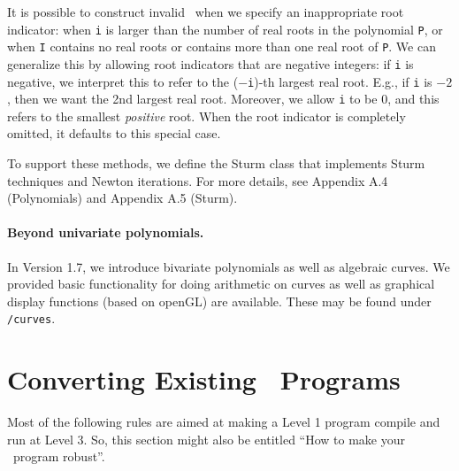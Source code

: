 \documentclass[12pt]{article}
\begin{document}
It is possible to construct invalid \expr\ when we specify
an inappropriate root indicator:
when {\tt i} is larger than the number of real roots in the polynomial {\tt P},
or when {\tt I} contains no real roots or contains 
more than one real root of {\tt P}.
We can generalize this by allowing root 
indicators that are negative integers:
if {\tt i} is negative, we interpret this to refer to the
($-${\tt i})-th largest
real root.  E.g., if {\tt i} is $-2$, then we want the 2nd largest real
root.  Moreover, we allow {\tt i} to be $0$, and this refers to
the smallest {\em positive} root.   When the root indicator is completely
omitted, it defaults to this special case.

To support these methods, we define the Sturm class that
implements Sturm techniques and Newton iterations.
For more details, see Appendix A.4 (Polynomials) and Appendix A.5 (Sturm).

\paragraph{Beyond univariate polynomials.}
In Version 1.7, we introduce bivariate polynomials
as well as algebraic curves.  We provided
basic functionality for doing arithmetic on curves
as well as graphical display functions (based 
on openGL) are available.
These may be found under \progsdir\texttt{/curves}.

\section{Converting Existing \candcpp\ Programs}
	\label{sec-convert}

Most of the following rules are aimed at making
a Level 1 program compile and run at Level 3.
So, this section might also be entitled
``How to make your \candcpp\ program robust''.
\end{document}
